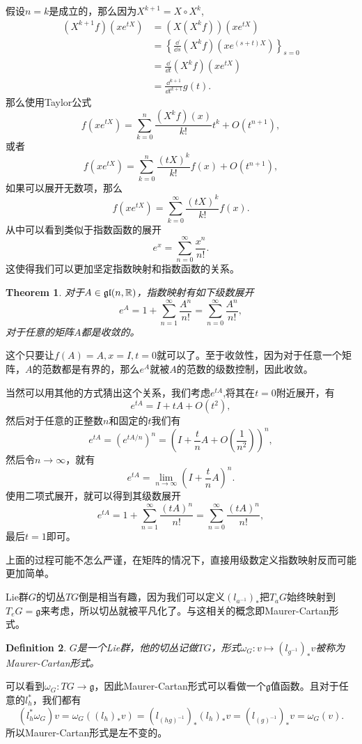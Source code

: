 \documentclass[9pt]{extbook}
\theoremstyle{plain}
\newtheorem{defi}{Definition}
\newtheorem{theo}[defi]{Theorem}
\newcommand{\lag}{{\mathfrak{g}}}  %
\begin{document}
假设$n=k$是成立的，那么因为$X^{k+1}=X\circ X^k$,
\[
	\begin{split}
	(X^{k+1}f)(x e^{tX})&=(X(X^{k}f))(x e^{tX})\\
	&=\left\{\frac{\dd}{\dd s}(X^kf)(x e^{(s+t)X})\right\}_{s=0}\\
	&=\frac{\dd}{\dd t}(X^kf)(x e^{tX})\\
	&=\frac{\dd^{k+1}}{\dd t^{k+1}}g(t).
	\end{split}
\]
那么使用Taylor公式
\[
	f(xe^{tX})=\sum_{k=0}^n\frac{(X^{k}f)(x)}{k!}t^k+O(t^{n+1}),
\]
或者
\[
	f(xe^{tX})=\sum_{k=0}^n\frac{(tX)^{k}}{k!}f(x)+O(t^{n+1}),
\]
如果可以展开无数项，那么
\[
	f(xe^{tX})=\sum_{k=0}^\infty\frac{(tX)^{k}}{k!}f(x).
\]
从中可以看到类似于指数函数的展开
\[
	e^x=\sum_{n=0}^\infty \frac{x^n}{n!}.
\]
这使得我们可以更加坚定指数映射和指数函数的关系。
\begin{theo}
对于$A\in\mathfrak{gl}(n,\mathbb{R})$，指数映射有如下级数展开
\[
	e^A=1+\sum_{n=1}^\infty \frac{A^n}{n!}=\sum_{n=0}^\infty \frac{A^n}{n!},
\]
对于任意的矩阵$A$都是收敛的。
\end{theo}

这个只要让$f(A)=A,x=I,t=0$就可以了。至于收敛性，因为对于任意一个矩阵，$A$的范数都是有界的，那么$e^A$就被$A$的范数的级数控制，因此收敛。

当然可以用其他的方式猜出这个关系，我们考虑$e^{tA}$,将其在$t=0$附近展开，有
\[
e^{tA}=I+tA+O(t^2),
\]
然后对于任意的正整数$n$和固定的$t$我们有
\[
e^{tA}=\left(e^{tA/n}\right)^n=\left(I+\frac{t}{n}A+O\left(\frac{1}{n^2}\right)\right)^n,
\]
然后令$n\to\infty$，就有
\[
e^{tA}=\lim_{n\to\infty}\left(I+\frac{t}{n}A\right)^n.
\]
使用二项式展开，就可以得到其级数展开
\[
	e^{tA}=1+\sum_{n=1}^\infty \frac{(tA)^n}{n!}=\sum_{n=0}^\infty \frac{(tA)^n}{n!},
\]
最后$t=1$即可。

上面的过程可能不怎么严谨，在矩阵的情况下，直接用级数定义指数映射反而可能更加简单。

Lie群$G$的切丛$TG$倒是相当有趣，因为我们可以定义$(l_{a^{-1}})_*$把$T_aG$始终映射到$T_eG=\lag$来考虑，所以切丛就被平凡化了。与这相关的概念即Maurer-Cartan形式。
\begin{defi}
$G$是一个Lie群，他的切丛记做$TG$，形式$\omega_G:v\mapsto (l_{g^{-1}})_*v$被称为Maurer-Cartan形式。
\end{defi}
可以看到$\omega_G:TG\to \lag$，因此Maurer-Cartan形式可以看做一个$\lag$值函数。且对于任意的$l_h^*$，我们都有
\[
(l_h^*\omega_G)v=\omega_G((l_h)_*v)=(l_{(hg)^{-1}})_*(l_h)_*v=(l_{(g)^{-1}})_*v=\omega_G(v).
\]
所以Maurer-Cartan形式是左不变的。
\end{document}
